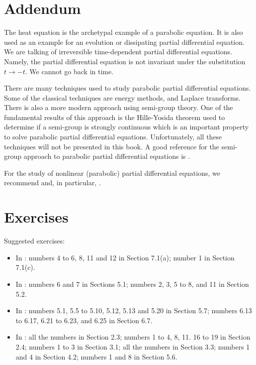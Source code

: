 \section{Addendum}

The heat equation is the archetypal example of a parabolic equation.
It is also used as an example for an evolution or dissipating partial
differential equation.  We are talking of irreversible time-dependent
partial differential equations.  Namely, the partial differential equation
is not invariant under the substitution $t \to -t$.  We cannot go back
in time.

There are many techniques used to study parabolic partial differential
equations.  Some of the classical techniques are energy methods, and
Laplace transforms.  There is also a more modern approach using
semi-group theory.  One of the fundamental results of this approach is
the Hille-Yosida theorem used to determine if a semi-group is strongly
continuous which is an important property to solve parabolic partial
differential equations.  Unfortunately, all these techniques will not
be presented in this book.  A good reference for the semi-group
approach to parabolic partial differential equations is \cite{He}.

For the study of nonlinear (parabolic) partial differential
equations, we recommend \cite{Smo} and, in particular, \cite{He}.

\section{Exercises}

Suggested exercises:

\begin{itemize}
\item In \cite{J}: numbers 4 to 6, 8, 11 and 12 in Section 7.1(a);
number 1 in Section 7.1(c).
\item In \cite{McO}: numbers 6 and 7 in Sections 5.1; numbers 2, 3, 5 to
8, and 11 in Section 5.2.
\item In \cite{PinRub}: numbers 5.1, 5.5 to 5.10, 5.12, 5.13 and 5.20
  in Section 5.7; numbers 6.13 to 6.17, 6.21 to 6.23, and 6.25 in Section 6.7. 
\item In \cite{Str}: all the numbers in Section 2.3; numbers 1 to 4, 8,
  11. 16 to 19 in Section 2.4; numbers 1 to 3 in Section 3.1; all
  the numbers in Section 3.3; numbers 1 and 4 in Section 4.2; numbers 1
  and 8 in Section 5.6.
\end{itemize}

